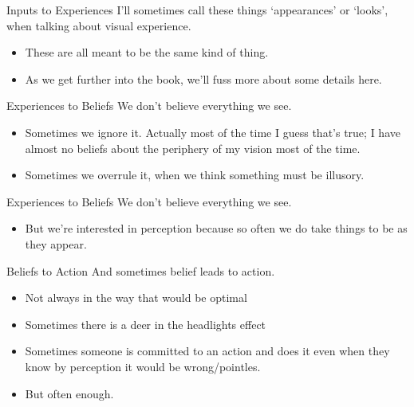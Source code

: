 \documentclass[
  17pt,
  letterpaper,
  ignorenonframetext,
  aspectratio=169,
  xcolor={dvipsnames}]{beamer}
\providecommand{\tightlist}{%
  \setlength{\itemsep}{0pt}\setlength{\parskip}{0pt}}\usepackage{longtable,booktabs,array}
\begin{document}
\begin{frame}{Inputs to Experiences}
\protect\hypertarget{inputs-to-experiences-2}{}
I'll sometimes call these things `appearances' or `looks', when talking
about visual experience.

\begin{itemize}[<+->]
\tightlist
\item
  These are all meant to be the same kind of thing.
\item
  As we get further into the book, we'll fuss more about some details
  here.
\end{itemize}
\end{frame}

\begin{frame}{Experiences to Beliefs}
\protect\hypertarget{experiences-to-beliefs}{}
We don't believe everything we see.

\begin{itemize}[<+->]
\tightlist
\item
  Sometimes we ignore it. Actually most of the time I guess that's true;
  I have almost no beliefs about the periphery of my vision most of the
  time.
\item
  Sometimes we overrule it, when we think something must be illusory.
\end{itemize}
\end{frame}

\begin{frame}{Experiences to Beliefs}
\protect\hypertarget{experiences-to-beliefs-1}{}
We don't believe everything we see.

\begin{itemize}[<+->]
\tightlist
\item
  But we're interested in perception because so often we do take things
  to be as they appear.
\end{itemize}
\end{frame}

\begin{frame}{Beliefs to Action}
\protect\hypertarget{beliefs-to-action}{}
And sometimes belief leads to action.

\begin{itemize}[<+->]
\tightlist
\item
  Not always in the way that would be optimal
\item
  Sometimes there is a deer in the headlights effect
\item
  Sometimes someone is committed to an action and does it even when they
  know by perception it would be wrong/pointles.
\item
  But often enough.
\end{itemize}
\end{frame}
\end{document}
